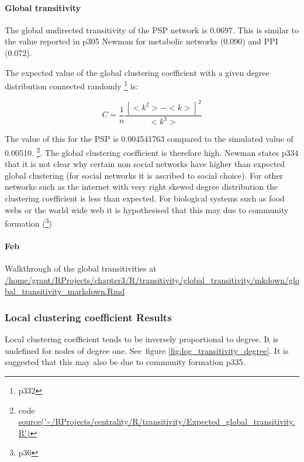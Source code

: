 \paragraph{Global transitivity}
The global undirected transitivity of the PSP network is 0.0697. This is similar to the value reported in p305 Newman \cite{newman2018networks} for metabolic networks (0.090) and PPI (0.072).

The expected value of the global clustering coefficient with a given degree distribution connected randomly \cite{newman2018networks}\footnote{p332} is:

\begin{equation}
    C=\frac{1}{n}\frac{[<k^2> - <k>]^2}{<k^3>}
\end{equation}


The value of this for the PSP is 0.004541763 compared to the simulated value of 0.00510. \footnote{code \url{source('~/RProjects/centrality/R/transitivity/Expected_global_transitivity.R')}}. The global clustering coefficient is therefore high. Newman states p334 \cite{newman2018networks} that it is not clear why certain non social networks have higher than expected global clustering (for social networks it is ascribed to social choice). For other networks such as the internet with very right skewed degree distribution the clustering coefficient is less than expected. For biological systems such as food webs or the world wide web it is hypothesised that this may due to community formation (\cite{newman2018networks}\footnote{p36})


\paragraph{Feb}
Walkthrough of the global transitivities at \url{/home/grant/RProjects/chapter3/R/transitivity/global_transitivity/mkdown/global_transitivity_markdown.Rmd}




\subsubsection{Local clustering coefficient Results}
Local clustering coefficient tends to be inversely proportional to degree. It is undefined for nodes of degree one. See~figure \ref{fig:log_transitivity_degree}. It is suggested that this may also be due to community formation \cite{newman2018networks} p335.

